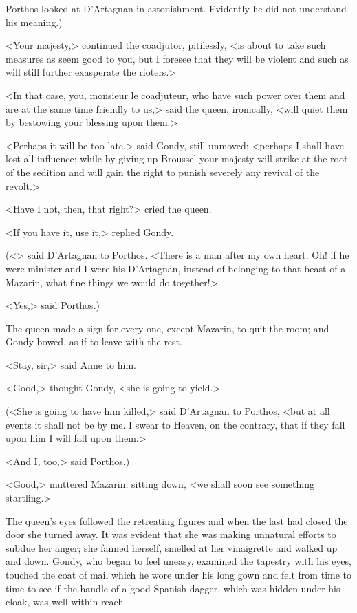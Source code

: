Porthos looked at D'Artagnan in astonishment. Evidently he did not understand his meaning.)

<Your majesty,> continued the coadjutor, pitilessly, <is about to take such measures as seem good to you, but I foresee that they will be violent and such as will still further exasperate the rioters.>

<In that case, you, monsieur le coadjuteur, who have such power over them and are at the same time friendly to us,> said the queen, ironically, <will quiet them by bestowing your blessing upon them.>

<Perhaps it will be too late,> said Gondy, still unmoved; <perhaps I shall have lost all influence; while by giving up Broussel your majesty will strike at the root of the sedition and will gain the right to punish severely any revival of the revolt.>

<Have I not, then, that right?> cried the queen.

<If you have it, use it,> replied Gondy.

(<> said D'Artagnan to Porthos. <There is a man after my own heart. Oh! if he were minister and I were his D'Artagnan, instead of belonging to that beast of a Mazarin,  what fine things we would do together!>

<Yes,> said Porthos.)

The queen made a sign for every one, except Mazarin, to quit the room; and Gondy bowed, as if to leave with the rest.

<Stay, sir,> said Anne to him.

<Good,> thought Gondy, <she is going to yield.>

(<She is going to have him killed,> said D'Artagnan to Porthos, <but at all events it shall not be by me. I swear to Heaven, on the contrary, that if they fall upon him I will fall upon them.>

<And I, too,> said Porthos.)

<Good,> muttered Mazarin, sitting down, <we shall soon see something startling.>

The queen's eyes followed the retreating figures and when the last had closed the door she turned away. It was evident that she was making unnatural efforts to subdue her anger; she fanned herself, smelled at her vinaigrette and walked up and down. Gondy, who began to feel uneasy, examined the tapestry with his eyes, touched the coat of mail which he wore under his long gown and felt from time to time to see if the handle of a good Spanish dagger, which was hidden under his cloak, was well within reach.


